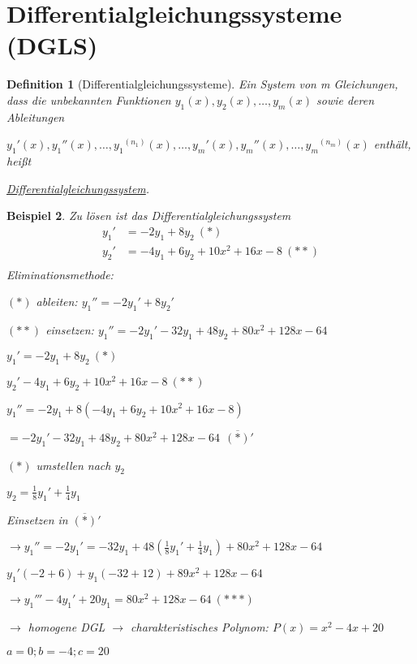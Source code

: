 \documentclass[fontset=ubuntu,12pt,a4paper]{scrreprt}
\newtheorem{defi}{Definition}[section]
\newtheorem{beispiel}[defi]{Beispiel}
\begin{document}
     \section{Differentialgleichungssysteme (DGLS)}

     \begin{defi}[Differentialgleichungssysteme]
        Ein System von m Gleichungen, dass die unbekannten Funktionen \(y_1(x),y_2(x),\dots,y_m(x)\) sowie deren Ableitungen

        \({y_1}'(x),{y_1}''(x),\dots,{y_1}^{(n_1)}(x),\dots,{y_m}'(x),{y_m}''(x),\dots,{y_m}^{(n_m)}(x)\) enthält, heißt
        
        \underline{Differentialgleichungssystem}.
     \end{defi}

     \begin{beispiel}
        Zu lösen ist das Differentialgleichungssystem
        \begin{align*}
            {y_1}' &= -2y_1+8y_2\ (*) \\
            {y_2}' &= -4y_1+6y_2+10x^2+16x-8\ (**) \\
        \end{align*}
        Eliminationsmethode:

        \((*)\) ableiten: \({y_1}'' = -2{y_1}'+8{y_2}'\)

        \((**)\) einsetzen: \({y_1}'' = -2{y_1}'-32y_1+48y_2+80x^2+128x-64\)

        \(y_1'=-2y_1+8y_2\ (*)\)

        \(y_2'-4y_1+6y_2+10x^2+16x-8\ (**)\)

        \( y_1''=-2y_1+8(-4y_1+6y_2+10x^2+16x-8) \)

        \( =-2y_1'-32y_1+48y_2+80x^2+128x-64\ \ \overline{(*)}' \)

        \((*)\) umstellen nach \(y_2\)

        \(y_2=\frac{1}{8}y_1'+\frac{1}{4}y_1\)

        Einsetzen in \( \overline{(*)}' \)

        \( \rightarrow y_1''=-2y_1'=-32y_1+48(\frac{1}{8}y_1'+\frac{1}{4}y_1) + 80x^2+128x-64 \)

        \(y_1'(-2+6)+y_1(-32+12)+89x^2+128x-64 \)

        \(\rightarrow y_1'''-4y_1'+20y_1=80x^2+128x-64\ (***) \)

        \(\to\) homogene DGL \(\to\) charakteristisches Polynom: \(P(x)=x^2-4x+20\)

        \(a=0; b=-4;c=20\)


\end{beispiel}
\end{document}
